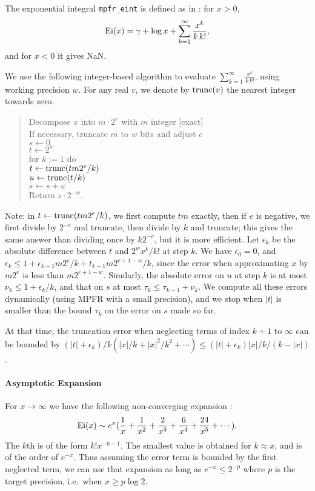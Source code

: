 \documentclass[12pt]{amsart}
\def\q{\hspace*{5mm}}
\begin{document}
The exponential integral \verb|mpfr_eint| is defined as in
\cite[formula 5.1.10]{AbSt73}: for $x > 0$,
\[ {\rm Ei}(x) = \gamma + \log x + \sum_{k=1}^{\infty} \frac{x^k}{k \, k!}, \]
and for $x < 0$ it gives NaN.

We use the following integer-based algorithm to evaluate
$\sum_{k=1}^{\infty} \frac{x^k}{k \, k!}$, using working precision $w$.
For any real $v$, we denote by ${\rm trunc}(v)$ the nearest integer
towards zero.
\begin{quote}
Decompose $x$ into  $m\cdot2^e$ with $m$ integer [exact] \\
If necessary, truncate $m$ to $w$ bits and adjust $e$ \\
$s \leftarrow 0$ \\ %
$t \leftarrow 2^w$ \\ %
for $k := 1$ do \\
\q $t \leftarrow {\rm trunc}(t m 2^e/k)$ \\
\q $u \leftarrow {\rm trunc}(t/k)$ \\
\q $s \leftarrow s + u$ \\
Return $s \cdot 2^{-w}$.
\end{quote}
Note: in $t \leftarrow {\rm trunc}(t m 2^e/k)$,
we first compute $tm$ exactly, then if $e$ is negative,
we first divide by $2^{-e}$ and
truncate, then divide by $k$ and truncate; this gives the same answer than
dividing once by $k 2^{-e}$, but it is more efficient.
Let $\epsilon_k$ be the absolute difference between $t$ and
$2^w x^k/k!$ at step $k$.
We have $\epsilon_0=0$, and $\epsilon_k \leq 1 + \epsilon_{k-1} m 2^e/k
+ t_{k-1} m 2^{e+1-w}/k$, since the error when approximating $x$ by
$m 2^e$ is less than $m 2^{e+1-w}$.
Similarly, the absolute error on $u$ at step $k$ is at most
$\nu_k \leq 1 + \epsilon_k/k$,
and that on $s$ at most $\tau_k \leq \tau_{k-1} + \nu_k$.
We compute all these errors dynamically (using MPFR with a small precision),
and we stop when $|t|$ is smaller than the bound $\tau_k$
on the error on $s$ made so far.

At that time, the truncation error when neglecting terms of index $k+1$
to $\infty$ can be bounded by $(|t| + \epsilon_k)/k (|x|/k + |x|^2/k^2 +
\cdots) \leq (|t| + \epsilon_k) |x|/k/(k-|x|)$.

\paragraph{Asymptotic Expansion}

For $x \rightarrow \infty$ we have the following non-converging
expansion \cite[formula 5.1.51]{AbSt73}:
\[ {\rm Ei}(x) \sim e^x (\frac{1}{x} + \frac{1}{x^2} + \frac{2}{x^3}
    + \frac{6}{x^4} + \frac{24}{x^5} + \cdots). \]
The $k$th is of the form $k! x^{-k-1}$. The smallest value is obtained for
$k \approx x$, and is of the order of $e^{-x}$. Thus assuming the error
term is bounded by the first neglected term, we can use that expansion
as long as $e^{-x} \leq 2^{-p}$ where $p$ is the target precision,
i.e.~when $x \geq p \log 2$.
\end{document}
